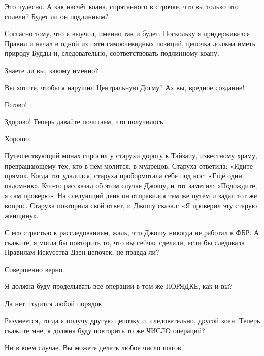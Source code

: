 \documentclass[../main.tex]{subfiles}
\begin{document}
\begin{dialogue}
 Это чудесно. А как насчёт коана, спрятанного в строчке, что вы только что сплели? Будет ли он подлинным?

 Согласно тому, что я выучил, именно так и будет. Поскольку я придерживался Правил и начал в одной из пяти самоочевидных позиций, цепочка должна иметь природу Будды и, следовательно, соответствовать подлинному коану.

 Знаете ли вы, какому именно?

 Вы хотите, чтобы я нарушил Центральную Догму? Ах вы, вредное создание!


Готово!

 Здорово! Теперь давайте почитаем, что получилось.

 Хорошо.

\begin{koan}
    Путешествующий монах спросил у старухи дорогу к Тайзаиу, известному храму, превращающему тех, кто в нем молится, в мудрецов. Старуха ответила: «Идите прямо». Когда тот удалился, старуха пробормотала себе под нос: «Ещё один паломник». Кто-то рассказал об этом случае Джошу, и тот заметил: «Подождите, я сам проверю». На следующий день он отправился тем же путем и задал тот же вопрос. Старуха повторила свой ответ, и Джошу сказал: «Я проверил эту старую женщину».
\end{koan}

 С его страстью к расследованиям, жаль, что Джошу никогда не работал в ФБР\@. А скажите, я могла бы повторить то, что вы сейчас сделали, если бы следовала Правилам Искусства Дзен-цепочек, не правда ли?

 Совершенно верно.

 Я должна буду проделывать все операции в том же ПОРЯДКЕ, как и вы?

 Да нет, годится любой порядок.

 Разумеется, тогда я получу другую цепочку и, следовательно, другой коан. Теперь скажите мне, я должна буду повторить то же ЧИСЛО операций?

 Ни в коем случае. Вы можете делать любое число шагов.


\end{dialogue}
\end{document}
